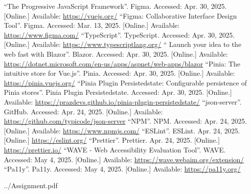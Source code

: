 \documentclass[12pt, a4paper]{article}
\begin{document}
\begin{thebibliography}{9}
        ``The Progressive JavaScript Framework''. Figma. Accessed: Apr. 30, 2025. [Online.]
        Available: \url{https://vuejs.org/}
        ``Figma: Collaborative Interface Design Tool''. Figma. Accessed: Mar. 13, 2025. [Online.]
        Available: \url{https://www.figma.com/}
        ``TypeScript''. TypeScript. Accessed: Apr. 30, 2025. [Online.] Available:
        \url{https://www.typescriptlang.org/}
        `` Launch your idea to the web fast with Blazor''. Blazor. Accessed: Apr. 30, 2025.
        [Online.] Available: \url{https://dotnet.microsoft.com/en-us/apps/aspnet/web-apps/blazor}
        ``Pinia: The intuitive store for Vue.js''. Pinia. Accessed: Apr. 30, 2025. [Online.]
        Available: \url{https://pinia.vuejs.org/}
        ``Pinia Plugin Persistedstate: Configurable persistence of Pinia stores''.
        Pinia Plugin Persistedstate. Accessed: Apr. 30, 2025. [Online.] Available:
        \url{https://prazdevs.github.io/pinia-plugin-persistedstate/}
        ``json-server''. GitHub. Accessed: Apr. 24, 2025. [Online.] Available:
        \url{https://github.com/typicode/json-server}
        ``NPM''. NPM. Accessed: Apr. 24, 2025. [Online.] Available: \url{https://www.npmjs.com/}
        ``ESLint''. ESLint. Apr. 24, 2025. [Online.] \url{https://eslint.org/}
        ``Prettier''. Prettier. Apr. 24, 2025. [Online.] \url{https://prettier.io/}
        ``WAVE - Web Accessibility Evaluation Tool''. WAVE. Accessed: May 4, 2025. [Online.]
        Available: \url{https://wave.webaim.org/extension/}
        ``Pa11y''. Pa11y. Accessed: May 4, 2025. [Online.] Available: \url{https://pa11y.org/}
\end{thebibliography}
\endgroup


    {../Assignment.pdf}

\end{document}
